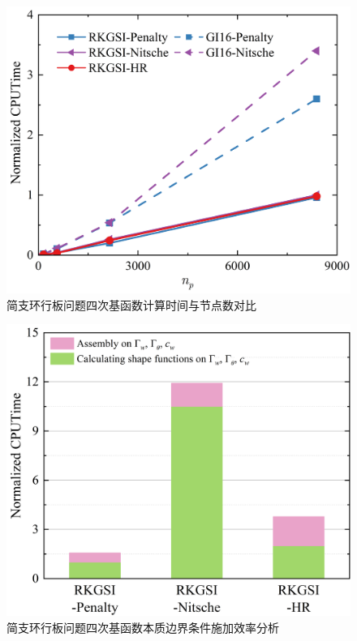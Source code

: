 \begin{figure}[H]
    \centering
    \includegraphics[scale=0.5]{figure/PHR/A/Qcputime.png}
    \caption{简支环行板问题四次基函数计算时间与节点数对比}\label{AQcputime}
\end{figure}
\newpage
\begin{figure}[H]
    \centering
    \includegraphics[scale=0.5]{figure/PHR/A/Qefficiency.png}
    \caption{简支环行板问题四次基函数本质边界条件施加效率分析}\label{AQefficiency}
\end{figure}
